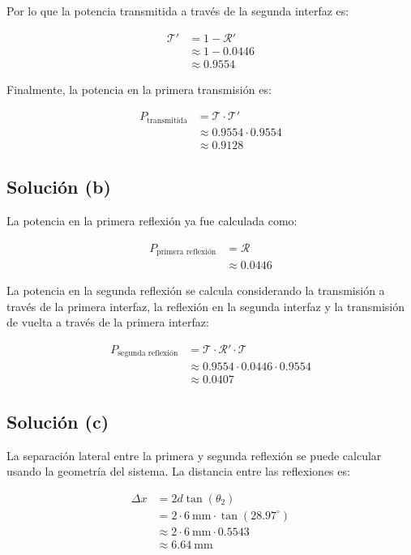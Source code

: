 \documentclass[11pt]{article}
\begin{document}
Por lo que la potencia transmitida a través de la segunda interfaz es:

\begin{align*}
    \mathcal{T}' &= 1 - \mathcal{R}' \\
    &\approx 1 - 0.0446 \\
    &\approx 0.9554
\end{align*}

Finalmente, la potencia en la primera transmisión es:

\begin{align*}
    P_{\text{transmitida}} &= \mathcal{T} \cdot \mathcal{T}' \\
    &\approx 0.9554 \cdot 0.9554 \\
    &\approx 0.9128
\end{align*}

\subsection*{Solución (b)}

La potencia en la primera reflexión ya fue calculada como:

\begin{align*}
    P_{\text{primera reflexión}} &= \mathcal{R} \\
    &\approx 0.0446
\end{align*}

La potencia en la segunda reflexión se calcula considerando la transmisión a través de la primera interfaz, la reflexión en la segunda interfaz y la transmisión de vuelta a través de la primera interfaz:

\begin{align*}
    P_{\text{segunda reflexión}} &= \mathcal{T} \cdot \mathcal{R}' \cdot \mathcal{T} \\
    &\approx 0.9554 \cdot 0.0446 \cdot 0.9554 \\
    &\approx 0.0407
\end{align*}

\subsection*{Solución (c)}

La separación lateral entre la primera y segunda reflexión se puede calcular usando la geometría del sistema. La distancia entre las reflexiones es:

\begin{align*}
    \Delta x &= 2 d \tan(\theta_2) \\
    &= 2 \cdot 6\ \text{mm} \cdot \tan(28.97^\circ) \\
    &\approx 2 \cdot 6\ \text{mm} \cdot 0.5543 \\
    &\approx 6.64\ \text{mm}
\end{align*}
\end{document}
